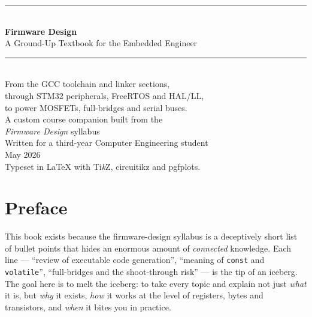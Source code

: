 \documentclass[11pt,a4paper,oneside]{book}
\newcommand{\code}[1]{\texttt{#1}}
\begin{document}
\frontmatter

\begingroup
\thispagestyle{empty}
\centering
\vspace*{2.2cm}
{\color{accent}\rule{\linewidth}{1.4pt}}\\[0.5cm]
{\Huge\bfseries\color{accent} Firmware Design}\\[0.35cm]
{\LARGE A Ground-Up Textbook for the Embedded Engineer}\\[0.4cm]
{\color{accent}\rule{\linewidth}{1.4pt}}\\[1.4cm]

{\large From the GCC toolchain and linker sections,\\
through STM32 peripherals, FreeRTOS and HAL/LL,\\
to power MOSFETs, full-bridges and serial buses.}\\[2.2cm]

{\large A custom course companion built from the\\ \emph{Firmware Design} syllabus}\\[1.0cm]

{\large Written for a third-year Computer Engineering student}\\[2.4cm]

{\large May 2026}\\[0.4cm]
\vfill
{\footnotesize Typeset in \LaTeX{} with Ti\textit{k}Z, circuitikz and pgfplots.}
\par\vspace*{\fill}
\endgroup
\clearpage

\chapter*{Preface}

This book exists because the firmware-design syllabus is a deceptively short
list of bullet points that hides an enormous amount of \emph{connected}
knowledge. Each line --- ``review of executable code generation'', ``meaning
of \code{const} and \code{volatile}'', ``full-bridges and the shoot-through
risk'' --- is the tip of an iceberg. The goal here is to melt the iceberg:
to take every topic and explain not just \emph{what} it is, but \emph{why}
it exists, \emph{how} it works at the level of registers, bytes and
transistors, and \emph{when} it bites you in practice.
\end{document}

